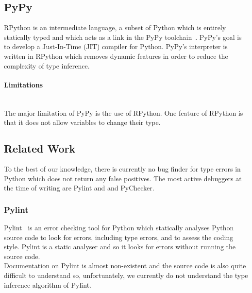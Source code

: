 \documentclass[12pt, titlepage]{article}
\begin{document}
\subsection{PyPy}
RPython is an intermediate language, a subset of Python which is entirely statically typed and which acts as a link in the PyPy toolchain~\cite{pypyRpython}. PyPy's goal is to develop a Just-In-Time (JIT) compiler for Python. PyPy's interpreter is written in RPython which removes dynamic features in order to reduce the complexity of type inference.
\paragraph{Limitations}\mbox{}\\
The major limitation of PyPy is the use of RPython. One feature of RPython is that it does not allow variables to change their type.

\subsection{Related Work}
To the best of our knowledge, there is currently no bug finder for type errors in Python which does not return any false positives. The most active debuggers at the time of writing are Pylint and and PyChecker.

\subsubsection{Pylint}
Pylint~\cite{pylint} is an error checking tool for Python which statically analyses Python source code to look for errors, including type errors, and to assess the coding style. Pylint is a static analyser and so it looks for errors without running the source code. \\
\indent Documentation on Pylint is almost non-existent and the source code is also quite difficult to understand so, unfortunately, we currently do not understand the type inference algorithm of Pylint.
\end{document}
